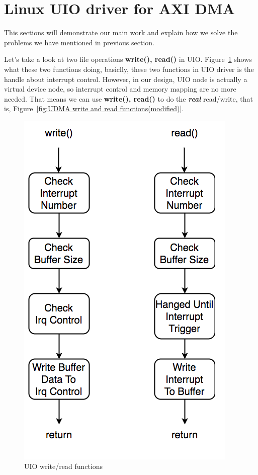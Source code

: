 \section{Linux UIO driver for AXI DMA}
\label{sec:Linux UIO driver for AXI DMA}
This sections will demonstrate our main work and explain how we solve the problems we have mentioned in previous section.

Let's take a look at two file operations \textbf{write(), read()} in UIO. Figure~\ref{fig:UIO write and read functions.} shows what these two functions doing, basiclly, these two functions in UIO driver is the handle about interrupt control. However, in our design, UIO node is actually a virtual device node, so interrupt control and memory mapping are no more needed. That means we can use \textbf{write(), read()} to do the \emph{\textbf{real}} read/write, that is, Figure~\ref{fig:UDMA write and read functions(modified)}. 
\begin{figure}[!htb]
  \centering
  \includegraphics[scale=0.5]{images/uio_func_write.png}
  \caption[UIO write/read functions.]{UIO write/read functions}
  \label{fig:UIO write and read functions.}
\end{figure}

